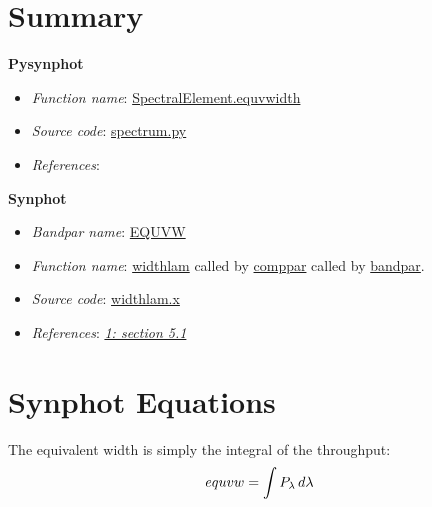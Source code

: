 \documentclass[letterpaper,10pt,english]{sphinxtsr}
\begin{document}
\section{Summary}
\label{main:id5}
\textbf{Pysynphot}
\begin{itemize}
\item {} 
\emph{Function name}: \href{https://trac.assembla.com/astrolib/browser/trunk/pysynphot/lib/pysynphot/spectrum.py\#L1126}{SpectralElement.equvwidth}

\item {} 
\emph{Source code}: \href{https://trac.assembla.com/astrolib/browser/trunk/pysynphot/lib/pysynphot/spectrum.py}{spectrum.py}

\item {} 
\emph{References}:

\end{itemize}

\textbf{Synphot}
\begin{itemize}
\item {} 
\emph{Bandpar name}: \href{https://svn.stsci.edu/trac/ssb/stsci\_python/browser/stsdas/trunk/stsdas/pkg/hst\_calib/synphot/doc/bandpar.hlp}{EQUVW}

\item {} 
\emph{Function name}: \href{https://svn.stsci.edu/trac/ssb/stsci\_python/browser/stsdas/trunk/stsdas/pkg/hst\_calib/synphot/newlib/widthlam.x}{widthlam}
called by \href{https://svn.stsci.edu/trac/ssb/stsci\_python/browser/stsdas/trunk/stsdas/pkg/hst\_calib/synphot/bandpar/comppar.x}{comppar} called by \href{https://svn.stsci.edu/trac/ssb/stsci\_python/browser/stsdas/trunk/stsdas/pkg/hst\_calib/synphot/bandpar/bandpar.x}{bandpar}.

\item {} 
\emph{Source code}: \href{https://svn.stsci.edu/trac/ssb/stsci\_python/browser/stsdas/trunk/stsdas/pkg/hst\_calib/synphot/newlib/widthlam.x}{widthlam.x}

\item {} 
\emph{References}: {\hyperref[references:ref1]{\emph{1: section 5.1}}}

\end{itemize}


\section{Synphot Equations}
\label{main:id7}
The equivalent width is simply the integral of the throughput:
\begin{gather}
\begin{split}equvw = \int P_{\lambda}\,d\lambda\end{split}\notag
\end{gather}
\end{document}
